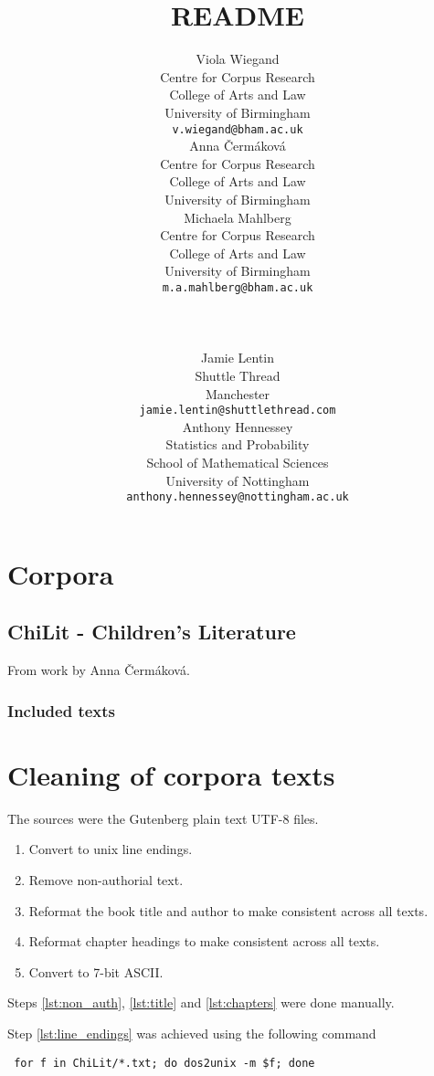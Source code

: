 \documentclass[a4paper,10pt]{paper}
\date{}
\author{
    \scriptsize
    \parbox{0.25\textwidth}{
       \small
       Viola Wiegand \\
       \scriptsize
       Centre for Corpus Research\\ College of Arts and Law\\ University of Birmingham \\
       \texttt{v.wiegand@bham.ac.uk}
    }
    \parbox{0.25\textwidth}{
       \small
       Anna Čermáková \\
       \scriptsize
       Centre for Corpus Research\\ College of Arts and Law\\ University of Birmingham
    }
    \parbox{0.25\textwidth}{
       \small
       Michaela Mahlberg \\
       \scriptsize
       Centre for Corpus Research\\ College of Arts and Law\\ University of Birmingham \\
       \texttt{m.a.mahlberg@bham.ac.uk}
    }
    \\ \\
    \parbox{0.30\textwidth}{
       \small
       Jamie Lentin \\
       \scriptsize
       Shuttle Thread\\ Manchester \\
       \texttt{jamie.lentin@shuttlethread.com}
    }
    \parbox{0.30\textwidth}{
        \small Anthony Hennessey \\
        \scriptsize
        Statistics and Probability\\ School of Mathematical Sciences\\ University of Nottingham \\
        \texttt{anthony.hennessey@nottingham.ac.uk}
    }
}
\title{README}
\begin{document}
\nocite{*}

\maketitle

\tableofcontents

\section{Corpora}

\subsection{ChiLit - Children's Literature}
From work by Anna Čermáková.

\subsubsection{Included texts}
\printbibliography[heading=none,keyword=ChiLit]

\section{Cleaning of corpora texts} \label{se:cleaning}
The sources were the Gutenberg plain text UTF-8 files.

\begin{enumerate}
    \item \label{lst:line_endings} Convert to unix line endings.
    \item \label{lst:non_auth} Remove non-authorial text.
    \item \label{lst:title} Reformat the book title and author to make consistent across all texts. 
    \item \label{lst:chapters} Reformat chapter headings to make consistent across all texts. 
    \item \label{lst:ascii_7} Convert to 7-bit ASCII.
\end{enumerate}

Steps \ref{lst:non_auth}, \ref{lst:title} and \ref{lst:chapters} were done manually.

Step \ref{lst:line_endings} was achieved using the following command
\begin{verbatim} for f in ChiLit/*.txt; do dos2unix -m $f; done \end{verbatim}
\end{document}
